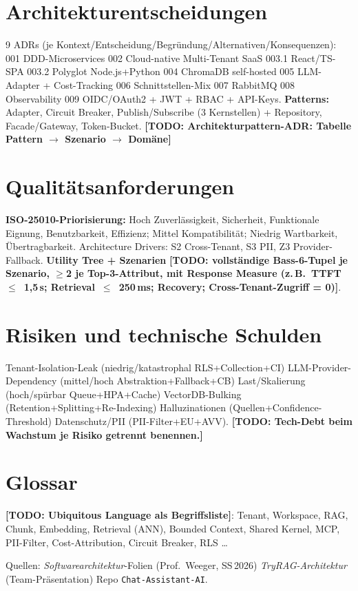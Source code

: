 \documentclass[11pt,a4paper]{article}
\newcommand{\todo}[1]{\textcolor{bad}{\textbf{[TODO: #1]}}}
\begin{document}
\section{Architekturentscheidungen }
9 ADRs (je Kontext/Entscheidung/Begr\"undung/Alternativen/Konsequenzen):
001 DDD-Microservices \textbullet{} 002 Cloud-native Multi-Tenant SaaS \textbullet{}
003.1 React/TS-SPA \textbullet{} 003.2 Polyglot Node.js+Python \textbullet{}
004 ChromaDB self-hosted \textbullet{} 005 LLM-Adapter + Cost-Tracking \textbullet{}
006 Schnittstellen-Mix \textbullet{} 007 RabbitMQ \textbullet{} 008 Observability
\textbullet{} 009 OIDC/OAuth2 + JWT + RBAC + API-Keys.
\textbf{Patterns:} Adapter, Circuit Breaker, Publish/Subscribe (3 Kernstellen) +
Repository, Facade/Gateway, Token-Bucket.
\todo{Architekturpattern-ADR: Tabelle Pattern $\rightarrow$ Szenario $\rightarrow$ Dom\"ane}

\section{Qualitätsanforderungen }
\textbf{ISO-25010-Priorisierung:} Hoch \textendash{} Zuverl\"assigkeit, Sicherheit,
Funktionale Eignung, Benutzbarkeit, Effizienz; Mittel \textendash{} Kompatibilit\"at;
Niedrig \textendash{} Wartbarkeit, \"Ubertragbarkeit. Architecture Drivers: S2
Cross-Tenant, S3 PII, Z3 Provider-Fallback.
\textbf{Utility Tree + Szenarien} \todo{vollst\"andige Bass-6-Tupel je Szenario,
$\geq$2 je Top-3-Attribut, mit Response Measure (z.\,B.\ TTFT~$\leq$~1,5\,s;
Retrieval~$\leq$~250\,ms; Recovery; Cross-Tenant-Zugriff = 0)}.

\section{Risiken und technische Schulden }
Tenant-Isolation-Leak (niedrig/katastrophal \textendash{} RLS+Collection+CI) \textbullet{}
LLM-Provider-Dependency (mittel/hoch \textendash{} Abstraktion+Fallback+CB) \textbullet{}
Last/Skalierung (hoch/sp\"urbar \textendash{} Queue+HPA+Cache) \textbullet{}
VectorDB-Bulking (Retention+Splitting+Re-Indexing) \textbullet{} Halluzinationen
(Quellen+Confidence-Threshold) \textbullet{} Datenschutz/PII (PII-Filter+EU+AVV).
\todo{Tech-Debt beim Wachstum je Risiko getrennt benennen.}

\section{Glossar }
\todo{Ubiquitous Language als Begriffsliste}: Tenant, Workspace, RAG, Chunk,
Embedding, Retrieval (ANN), Bounded Context, Shared Kernel, MCP, PII-Filter,
Cost-Attribution, Circuit Breaker, RLS \dots

\vfill
\begin{center}\small\color{ink}
Quellen: \emph{Softwarearchitektur}-Folien (Prof.\ Weeger, SS\,2026) \textbullet{}
\emph{TryRAG-Architektur} (Team-Pr\"asentation) \textbullet{} Repo
\texttt{Chat-Assistant-AI}.
\end{center}
\end{document}
